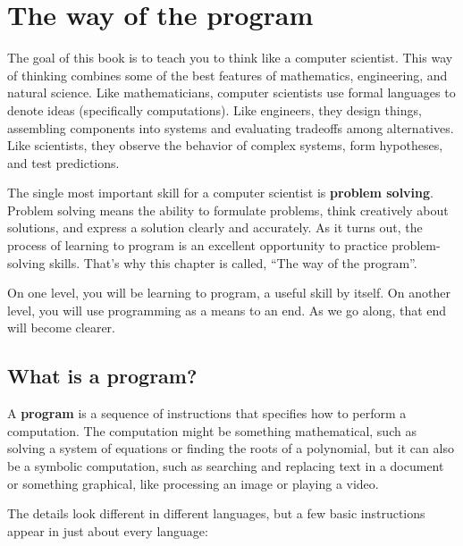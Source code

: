 \chapter{The way of the program}

The goal of this book is to teach you to think like a computer scientist. This
way of thinking combines some of the best features of mathematics,
engineering, and natural science. Like mathematicians, computer scientists use
formal languages to denote ideas (specifically computations). Like engineers,
they design things, assembling components into systems and evaluating
tradeoffs among alternatives. Like scientists, they observe the behavior of
complex systems, form hypotheses, and test predictions. 

The single most important skill for a computer scientist is {\bf problem
solving}. Problem solving means the ability to formulate problems, think
creatively about solutions, and express a solution clearly and accurately. As
it turns out, the process of learning to program is an excellent opportunity
to practice problem-solving skills. That's why this chapter is called, ``The
way of the program''.

On one level, you will be learning to program, a useful skill by itself. On
another level, you will use programming as a means to an end. As we go along,
that end will become clearer.


\section{What is a program?}

A {\bf program} is a sequence of instructions that specifies how to perform a
computation. The computation might be something mathematical, such as solving
a system of equations or finding the roots of a polynomial, but it can also be
a symbolic computation, such as searching and replacing text in a document or
something graphical, like processing an image or playing a video.

The details look different in different languages, but a few basic
instructions appear in just about every language:

